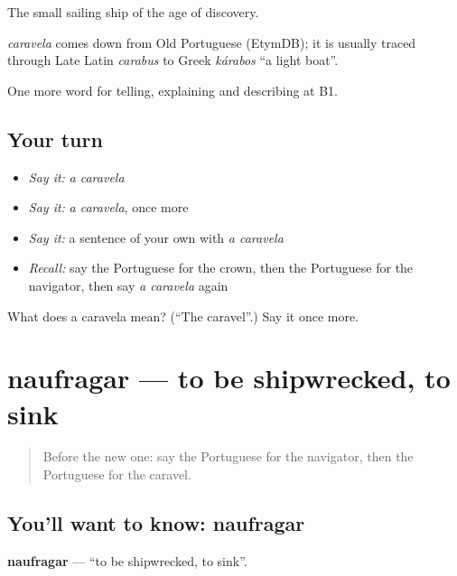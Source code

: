 The small sailing ship of the age of discovery.

\begin{cousinweb}
\emph{caravela} comes down from Old Portuguese (EtymDB); it is usually traced through Late Latin \emph{carabus} to Greek \emph{kárabos} \textquotedblleft{}a light boat\textquotedblright{}.
\end{cousinweb}

\begin{grammarlens}[title={What you've built}]
One more word for telling, explaining and describing at B1.
\end{grammarlens}

\subsection*{Your turn}
\begin{itemize}
\raggedright
  \item \emph{Say it:} \emph{a caravela}
  \item \emph{Say it:} \emph{a caravela}, once more
  \item \emph{Say it:} a sentence of your own with \emph{a caravela}
  \item \emph{Recall:} say the Portuguese for the crown, then the Portuguese for the navigator, then say \emph{a caravela} again
\end{itemize}

\begin{tcolorbox}[breakable,colback=teal!4,colframe=teal!35!black,title={Before you move on}]
What does a caravela mean? (\textquotedblleft{}The caravel\textquotedblright{}.) Say it once more.
\end{tcolorbox}
\section[naufragar]{naufragar — to be shipwrecked, to sink}

\label{lesson:PT-C328-naufragar}



\begin{quote}
Before the new one: say the Portuguese for the navigator, then the Portuguese for the caravel.
\end{quote}

\subsection*{You'll want to know: naufragar}
\textbf{naufragar} — \textquotedblleft{}to be shipwrecked, to sink\textquotedblright{}.

